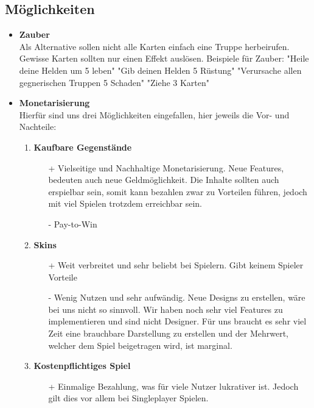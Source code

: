 \subsection*{Möglichkeiten}
\begin{itemize}
    \item \textbf{Zauber} \\
        Als Alternative sollen nicht alle Karten einfach eine Truppe herbeirufen. Gewisse Karten sollten nur einen Effekt auslösen.
        Beispiele für Zauber:
            "Heile deine Helden um 5 leben"
            "Gib deinen Helden 5 Rüstung"
            "Verursache allen gegnerischen Truppen 5 Schaden"
            "Ziehe 3 Karten"
    \item \textbf{Monetarisierung} \\
    Hierfür sind uns drei Möglichkeiten eingefallen, hier jeweils die Vor- und Nachteile:
    \begin{enumerate}
        \item \textbf{Kaufbare Gegenstände}
        \begin{itemize}
            \item[+] Vielseitige und Nachhaltige Monetarisierung. Neue Features, bedeuten auch neue Geldmöglichkeit. Die Inhalte sollten
                     auch erspielbar sein, somit kann bezahlen zwar zu Vorteilen führen, jedoch mit viel Spielen trotzdem erreichbar sein.
            \item[-] Pay-to-Win
        \end{itemize}
        \item \textbf{Skins}
        \begin{itemize}
            \item[+] Weit verbreitet und sehr beliebt bei Spielern. Gibt keinem Spieler Vorteile
            \item[-] Wenig Nutzen und sehr aufwändig. Neue Designs zu erstellen, wäre bei uns nicht so sinnvoll.
                     Wir haben noch sehr viel Features zu implementieren und sind nicht Designer. Für uns braucht es sehr
                     viel Zeit eine brauchbare Darstellung zu erstellen und der Mehrwert, welcher dem Spiel beigetragen wird, ist marginal.
        \end{itemize}
        \item \textbf{Kostenpflichtiges Spiel}
        \begin{itemize}
            \item[+] Einmalige Bezahlung, was für viele Nutzer lukrativer ist. Jedoch gilt dies vor allem bei Singleplayer Spielen.

\end{itemize}
\end{enumerate}
\end{itemize}
